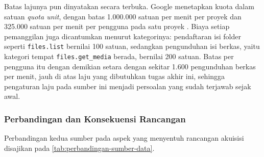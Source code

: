 Batas lajunya pun dinyatakan secara terbuka.
Google menetapkan kuota dalam satuan \textit{quota unit}, dengan batas 1.000.000 satuan per menit per proyek dan 325.000 satuan per menit per pengguna pada satu proyek \parencite{google2026drivelimits}.
Biaya setiap pemanggilan juga dicantumkan menurut kategorinya: pendaftaran isi folder seperti \texttt{files.list} bernilai 100 satuan, sedangkan pengunduhan isi berkas, yaitu kategori tempat \texttt{files.get\_media} berada, bernilai 200 satuan.
Batas per pengguna itu dengan demikian setara dengan sekitar 1.600 pengunduhan berkas per menit, jauh di atas laju yang dibutuhkan tugas akhir ini, sehingga pengaturan laju pada sumber ini menjadi persoalan yang sudah terjawab sejak awal.

\subsubsection{Perbandingan dan Konsekuensi Rancangan}
\label{sec:perbandingan-sumber}

Perbandingan kedua sumber pada aspek yang menyentuh rancangan akuisisi disajikan pada \autoref{tab:perbandingan-sumber-data}.

